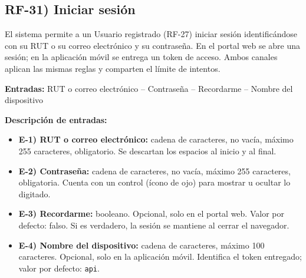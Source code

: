 
\subsection*{RF-31) Iniciar sesi\'on}
El sistema permite a un Usuario registrado (RF-27) iniciar sesi\'on identific\'andose con su RUT o su correo electr\'onico y su contrase\~na. En el portal web se abre una sesi\'on; en la aplicaci\'on m\'ovil se entrega un token de acceso. Ambos canales aplican las mismas reglas y comparten el l\'imite de intentos.

\textbf{Entradas:} RUT o correo electr\'onico -- Contrase\~na -- Recordarme -- Nombre del dispositivo

\textbf{Descripci\'on de entradas:}
\begin{itemize}[label={}, leftmargin=1.5em]
  \item \textbf{E-1) RUT o correo electr\'onico:} cadena de caracteres, no vac\'ia, m\'aximo 255 caracteres, obligatorio. Se descartan los espacios al inicio y al final.
  \item \textbf{E-2) Contrase\~na:} cadena de caracteres, no vac\'ia, m\'aximo 255 caracteres, obligatoria. Cuenta con un control (\'icono de ojo) para mostrar u ocultar lo digitado.
  \item \textbf{E-3) Recordarme:} booleano. Opcional, solo en el portal web. Valor por defecto: falso. Si es verdadero, la sesi\'on se mantiene al cerrar el navegador.
  \item \textbf{E-4) Nombre del dispositivo:} cadena de caracteres, m\'aximo 100 caracteres. Opcional, solo en la aplicaci\'on m\'ovil. Identifica el token entregado; valor por defecto: \texttt{api}.
\end{itemize}

